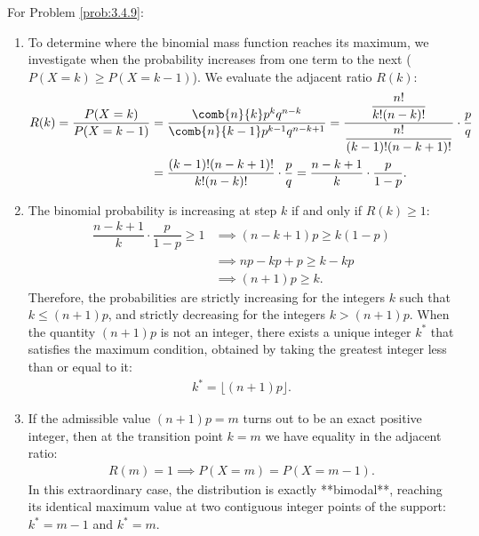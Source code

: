 \begin{solucion}
	\label{sol:3.4.9}
	For Problem \ref{prob:3.4.9}:
	\begin{enumerate}
		\item To determine where the binomial mass function reaches its maximum, we investigate when the probability increases from one term to the next ($P(X=k) \ge P(X=k-1)$). We evaluate the adjacent ratio $R(k)$:
		\begin{align*}
			R(k) = \dfrac{P(X=k)}{P(X=k-1)} &= \dfrac{\comb{n}{k} p^k q^{n-k}}{\comb{n}{k-1} p^{k-1} q^{n-k+1}} = \dfrac{\dfrac{n!}{k!(n-k)!}}{\dfrac{n!}{(k-1)!(n-k+1)!}} \cdot \dfrac{p}{q} \\
			&= \dfrac{(k-1)!(n-k+1)!}{k!(n-k)!} \cdot \dfrac{p}{q} = \dfrac{n-k+1}{k} \cdot \dfrac{p}{1-p}.
		\end{align*}
		\item The binomial probability is increasing at step $k$ if and only if $R(k) \ge 1$:
		\begin{align*}
			\dfrac{n-k+1}{k} \cdot \dfrac{p}{1-p} \ge 1 &\implies (n-k+1)p \ge k(1-p) \\
			&\implies np - kp + p \ge k - kp \\
			&\implies (n+1)p \ge k.
		\end{align*}
		Therefore, the probabilities are strictly increasing for the integers $k$ such that $k \le (n+1)p$, and strictly decreasing for the integers $k > (n+1)p$. When the quantity $(n+1)p$ is not an integer, there exists a unique integer $k^*$ that satisfies the maximum condition, obtained by taking the greatest integer less than or equal to it:
		\begin{align*}
			k^* = \lfloor (n+1)p \rfloor.
		\end{align*}
		\item If the admissible value $(n+1)p = m$ turns out to be an exact positive integer, then at the transition point $k = m$ we have equality in the adjacent ratio:
		\begin{align*}
			R(m) = 1 \implies P(X = m) = P(X = m-1).
		\end{align*}
		In this extraordinary case, the distribution is exactly **bimodal**, reaching its identical maximum value at two contiguous integer points of the support: $k^* = m-1$ and $k^* = m$.
	\end{enumerate}
\end{solucion}

